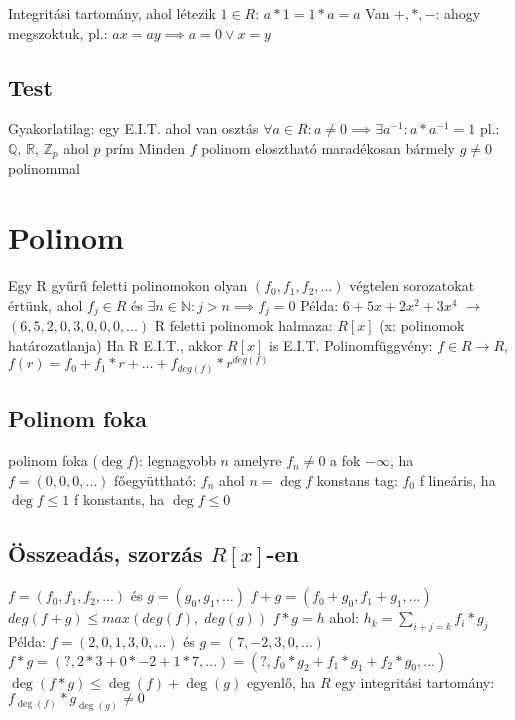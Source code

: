 \documentclass[12pt,a4paper]{article}
\begin{document}
\begin{outline}
	\1 Integritási tartomány, ahol létezik $1 \in R$: $a*1=1*a=a$
	\1 Van $+,*,-$: ahogy megszoktuk, pl.: $ax=ay \implies a=0 \lor x=y$
\end{outline}

\subsection{Test}

\begin{outline}
	\1 Gyakorlatilag: egy E.I.T. ahol van osztás
	\1 $\forall a \in R: a \ne 0 \implies \exists a^{-1}: a*a^{-1}=1$
	\1 pl.: $\mathbb{Q}$, $\mathbb{R}$, $\mathbb{Z}_p$ ahol $p$ prím
	\1 Minden $f$ polinom elosztható maradékosan bármely $g \ne 0$ polinommal
\end{outline}

\pagebreak

\section{Polinom}

\begin{outline}
	\1 Egy R gyűrű feletti polinomokon olyan $(f_0,f_1,f_2,...)$ végtelen sorozatokat értünk,
	ahol $f_j \in R$ és $\exists n \in \mathbb{N}: j>n \implies f_j=0$
	\1 Példa: $6+5x+2x^2+3x^4$ $\to$ $(6,5,2,0,3,0,0,0,...)$
	\1 R feletti polinomok halmaza: $R[x]$ (x: polinomok határozatlanja)
		\2 Ha R E.I.T., akkor $R[x]$ is E.I.T.
	\1 Polinomfüggvény: $f \in R \to R$, $f(r)=f_0+f_1*r+...+f_{deg(f)}*r^{deg(f)}$
\end{outline}

\subsection{Polinom foka}

\begin{outline}
	\1 polinom foka ($\deg f$): legnagyobb $n$ amelyre $f_n \ne 0$
		\2 a fok $-\infty$, ha $f=(0,0,0,...)$
	\1 főegyüttható: $f_n$ ahol $n=\deg f$
	\1 konstans tag: $f_0$
	\1 f lineáris, ha $\deg f \le 1$
	\1 f konstants, ha $\deg f \le 0$
\end{outline}

\subsection{Összeadás, szorzás $R[x]$-en}

\begin{outline}
	\1 $f=(f_0,f_1,f_2,...)$ és $g=(g_0,g_1,...)$
	\1 $f+g=(f_0+g_0,f_1+g_1,...)$
		\2 $deg (f+g) \le max(deg(f),\; deg(g))$
	\1 $f*g=h$ ahol: $h_k=\sum_{i+j=k}f_i*g_j$
		\2 Példa: $f=(2,0,1,3,0,...)$ és $g=(7,-2,3,0,...)$\\
		$f*g=(?,2*3+0*-2+1*7,...)=(?,f_0*g_2+f_1*g_1+f_2*g_0,...)$
		\2 $\deg (f*g) \le \deg(f)+\deg(g)$
			\3 egyenlő, ha $R$ egy integritási tartomány: $f_{\deg(f)}*g_{\deg(g)} \ne 0$
\end{outline}
\end{document}
